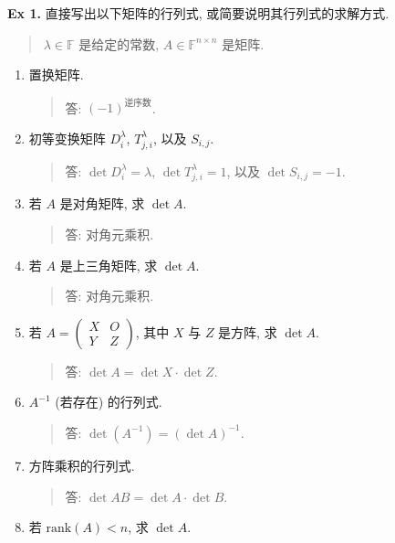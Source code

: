 \documentclass[
]{ctexart}
\author{}
\date{}
\begin{document}
\textbf{Ex 1.} 直接写出以下矩阵的行列式, 或简要说明其行列式的求解方式.

\begin{quote}
\(\lambda\in \mathbb F\) 是给定的常数, \(A\in \mathbb F^{n\times n}\)
是矩阵.
\end{quote}

\begin{enumerate}
\def\labelenumi{\arabic{enumi}.}
\item
  置换矩阵.

  \begin{quote}
  答: \((-1)^{\text{逆序数}}\).
  \end{quote}
\item
  初等变换矩阵 \(D^\lambda_i\), \(T^\lambda_{j,i}\), 以及 \(S_{i,j}\).

  \begin{quote}
  答: \(\det D^\lambda_i=\lambda\), \(\det T^\lambda_{j,i}=1\), 以及
  \(\det S_{i,j}=-1\).
  \end{quote}
\item
  若 \(A\) 是对角矩阵, 求 \(\det A\).

  \begin{quote}
  答: 对角元乘积.
  \end{quote}
\item
  若 \(A\) 是上三角矩阵, 求 \(\det A\).

  \begin{quote}
  答: 对角元乘积.
  \end{quote}
\item
  若 \(A=\begin{pmatrix}X&O\\Y&Z\end{pmatrix}\), 其中 \(X\) 与 \(Z\)
  是方阵, 求 \(\det A\).

  \begin{quote}
  答: \(\det A =\det X\cdot \det Z\).
  \end{quote}
\item
  \(A^{-1}\) (若存在) 的行列式.

  \begin{quote}
  答: \(\det (A^{-1})=(\det A)^{-1}\).
  \end{quote}
\item
  方阵乘积的行列式.

  \begin{quote}
  答: \(\det AB=\det A\cdot \det B\).
  \end{quote}
\item
  若 \(\mathrm{rank}(A)<n\), 求 \(\det A\).


\end{enumerate}
\end{document}
